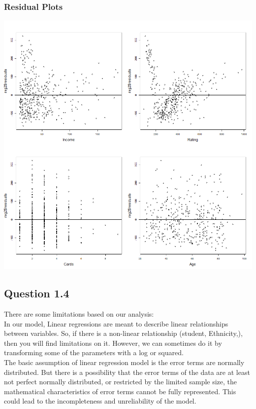 \documentclass[11pt]{article}
\begin{document}
{\subsubsection*{Residual Plots}
\begin{center}
\includegraphics[scale=0.45]{Residual Plots}
\end{center}



\subsection*{Question 1.4}
There are some limitations based on our analysis:\\

In our model, Linear regressions are meant to describe linear relationships between variables. So, if there is a non-linear relationship (student, Ethnicity,), then you will find limitations on it. However, we can sometimes do it by transforming some of the parameters with a log or squared.\\

The basic assumption of linear regression model is the error terms are normally distributed. But there is a possibility that the error terms of the data are at least not perfect normally distributed, or restricted by the limited sample size, the mathematical characteristics of error terms cannot be fully represented. This could lead to the incompleteness and unreliability of the model.\\


}
\end{document}
